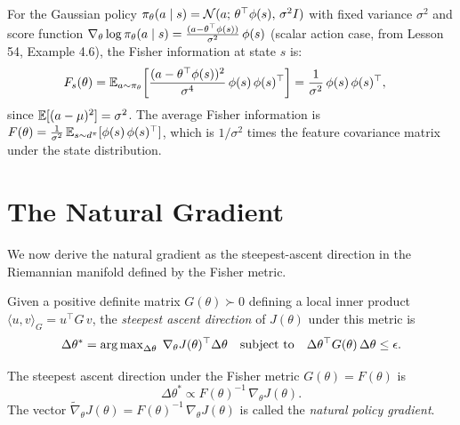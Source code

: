 \documentclass[11pt,a4paper]{article}
\begin{document}
\begin{example}
\label{ex:fisher-gaussian}
For the Gaussian policy $\pi_\theta(a \mid s) = \mathcal{N}(a;\,
\theta^\top \phi(s),\, \sigma^2 I)$ with fixed variance $\sigma^2$ and
score function $\nabla_\theta \log \pi_\theta(a \mid s) =
\frac{(a - \theta^\top \phi(s))}{\sigma^2}\, \phi(s)$ (scalar action
case, from Lesson 54, Example 4.6), the Fisher information at state $s$
is:
\begin{align*}
  F_s(\theta) &= \mathbb{E}_{a \sim \pi_\theta}\!\left[
    \frac{(a - \theta^\top \phi(s))^2}{\sigma^4}\,
    \phi(s)\, \phi(s)^\top\right]
  = \frac{1}{\sigma^2}\, \phi(s)\, \phi(s)^\top,
\end{align*}
since $\mathbb{E}[(a - \mu)^2] = \sigma^2$. The average Fisher information is
$F(\theta) = \frac{1}{\sigma^2}\, \mathbb{E}_{s \sim d^\pi}[\phi(s)\,
\phi(s)^\top]$, which is $1/\sigma^2$ times the feature covariance
matrix under the state distribution.
\end{example}

\section{The Natural Gradient}

We now derive the natural gradient as the steepest-ascent direction
in the Riemannian manifold defined by the Fisher metric.

\begin{definition}
\label{def:steepest-ascent}
Given a positive definite matrix $G(\theta) \succ 0$ defining a local
inner product $\langle u, v \rangle_G = u^\top G\, v$, the
\emph{steepest ascent direction} of $J(\theta)$ under this metric is
\[
  \Delta\theta^* = \operatorname{arg\,max}_{\Delta\theta}\; \nabla_\theta J(\theta)^\top
  \Delta\theta \quad \text{subject to} \quad
  \Delta\theta^\top G(\theta)\, \Delta\theta \leq \epsilon.
\]
\end{definition}

\begin{theorem}
\label{thm:natural-gradient}
The steepest ascent direction under the Fisher metric
$G(\theta) = F(\theta)$ is
\[
  \Delta\theta^* \propto F(\theta)^{-1}\, \nabla_\theta J(\theta).
\]
The vector $\tilde{\nabla}_\theta J(\theta) = F(\theta)^{-1}\,
\nabla_\theta J(\theta)$ is called the \emph{natural policy gradient}.
\end{theorem}
\end{document}
